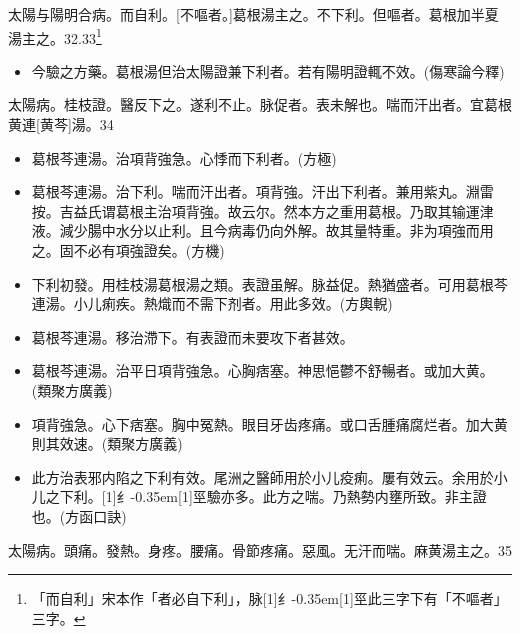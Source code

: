 \documentclass[11pt,oneside,b5paper]{ctexbook}
\begin{document}
\begin{flushleft}
太陽与陽明合病。而自利。[不嘔者。]葛根湯主之。不下利。但嘔者。葛根加半夏湯主之。32.33\footnote{「而自利」宋本作「者必自下利」，脉{\hbox{\scalebox{0.68}[1]{纟}\kern-0.35em\scalebox{0.64}[1]{巠}}}此三字下有「不嘔者」三字。}

\begin{itemize}
\item 今驗之方藥。葛根湯但治太陽證兼下利者。若有陽明證輒不效。(傷寒論今釋)
\end{itemize}

太陽病。桂枝證。醫反下之。遂利不止。脉促者。表未解也。喘而汗出者。宜葛根黄連[黄芩]湯。34

\begin{itemize}
\item 葛根芩連湯。治項背強急。心悸而下利者。(方極)
\item 葛根芩連湯。治下利。喘而汗出者。項背強。汗出下利者。兼用紫丸。淵雷按。吉益氏谓葛根主治項背強。故云尔。然本方之重用葛根。乃取其输運津液。減少腸中水分以止利。且今病毒仍向外解。故其量特重。非为項強而用之。固不必有項強證矣。(方機)
\item 下利初發。用桂枝湯葛根湯之類。表證虽解。脉益促。熱猶盛者。可用葛根芩連湯。小儿痢疾。熱熾而不需下剂者。用此多效。(方輿輗)
\item 葛根芩連湯。移治滯下。有表證而未要攻下者甚效。
\item 葛根芩連湯。治平日項背強急。心胸痞塞。神思悒鬱不舒暢者。或加大黄。(類聚方廣義)
\item 項背強急。心下痞塞。胸中冤熱。眼目牙齿疼痛。或口舌腫痛腐烂者。加大黄則其效速。(類聚方廣義)
\item 此方治表邪内陷之下利有效。尾洲之醫師用於小儿疫痢。屢有效云。余用於小儿之下利。{\hbox{\scalebox{0.68}[1]{纟}\kern-0.35em\scalebox{0.64}[1]{巠}}}驗亦多。此方之喘。乃熱勢内壅所致。非主證也。(方函口訣)
\end{itemize}

太陽病。頭痛。發熱。身疼。腰痛。骨節疼痛。惡風。无汗而喘。麻黄湯主之。35


\end{flushleft}
\end{document}
